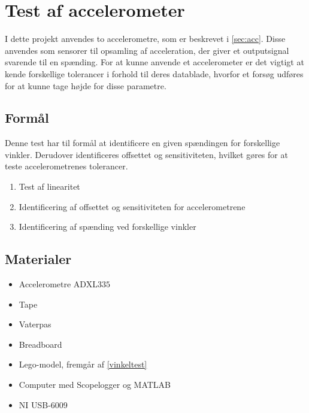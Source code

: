 \section{Test af accelerometer} 
\label{sec:test_acc}
I dette projekt anvendes to accelerometre, som er beskrevet i \autoref{sec:acc}. Disse anvendes som sensorer til opsamling af acceleration, der giver et outputsignal svarende til en spænding. For at kunne anvende et accelerometer er det vigtigt at kende forskellige tolerancer i forhold til deres datablade, hvorfor et forsøg udføres for at kunne tage højde for disse parametre.

\subsection{Formål}
Denne test har til formål at identificere en given spændingen for forskellige vinkler. Derudover identificeres %
offsettet og sensitiviteten, hvilket gøres for at teste accelerometrenes tolerancer.

\begin{enumerate}
\item Test af linearitet
\item Identificering af offsettet og sensitiviteten for accelerometrene
\item Identificering af spænding ved forskellige vinkler
\end{enumerate}

\subsection{Materialer}
\begin{itemize}
\item Accelerometre ADXL$335$
\item Tape
\item Vaterpas
\item Breadboard
\item Lego-model, fremgår af \autoref{vinkeltest}
\item Computer med Scopelogger og MATLAB
\item NI USB-6009
\end{itemize}

